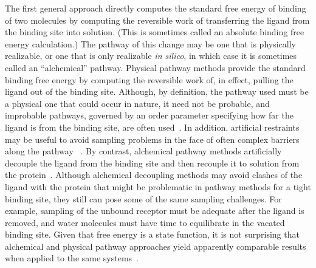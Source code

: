 \documentclass[aps,pre,twocolumn,nofootinbib,superscriptaddress,10pt, final,tightenlines]{revtex4-1}
\begin{document}
The first general approach directly computes the standard free energy of binding of two molecules by computing the reversible work of transferring the ligand from the binding site into solution. 
(This is sometimes called an absolute binding free energy calculation.) 
The pathway of this change may be one that is physically realizable, or one that is only realizable {\em in silico}, in which case it is sometimes called an ``alchemical'' pathway. 
Physical pathway methods provide the standard binding free energy by computing the reversible work of, in effect, pulling the ligand out of the binding site. 
Although, by definition, the pathway used must be a physical one that could occur in nature, it need not be probable, and improbable pathways, governed by an order parameter specifying how far the ligand is from the binding site, are often used~\cite{woo_calculation_2005, ytreberg_absolute_2009, velez-vega_overcoming_2013, henriksen_computational_2015, hsiao_prediction_2014, bhakat_resolving_2016}.  
In addition, artificial restraints may be useful to avoid sampling problems in the face of often complex barriers along the pathway ~\cite{woo_calculation_2005, velez-vega_overcoming_2013, henriksen_computational_2015, hsiao_prediction_2014, bhakat_resolving_2016}. 
By contrast, alchemical pathway methods artificially decouple the ligand from the binding site and then recouple it to solution from the protein~\cite{jorgensen_efficient_1988, hermans_free_1986, gilson_statistical-thermodynamic_1997, boresch_absolute_2003, mobley_use_2006}.
Although alchemical decoupling methods may avoid clashes of the ligand with the protein that might be problematic in pathway methods for a tight binding site, they still can pose some of the same sampling challenges.
For example, sampling of the unbound receptor must be adequate after the ligand is removed, and water molecules must have time to equilibrate in the vacated binding site.
Given that free energy is a state function, it is not surprising that alchemical and physical pathway approaches yield apparently comparable results when applied to the same systems~\cite{lee_calculation_2006, gumbart_standard_2013, de_ruiter_proteinligand_2013, yin_sampl5_preprint}.  
\end{document}
